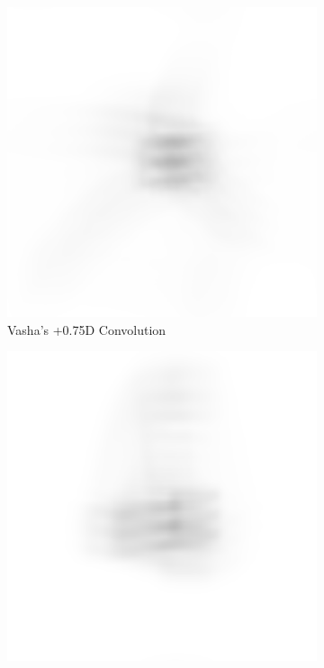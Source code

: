 \documentclass{article}
\begin{document}
\begin{figure}[H]
\begin{subfigure}{.3\textwidth}
  \centering
  \includegraphics[width=1\linewidth]{Vasha_R_G_0530_2_500_zer_075_5_PSF_convE.png}
  \caption{Vasha's +0.75D Convolution}
  \label{fig:vasha075d}
\end{subfigure}
\begin{subfigure}{.3\textwidth}
  \centering
  \includegraphics[width=1\linewidth]{Liz_R_G_0523_2_500_zer_075_5_PSF_convE.png}

\end{subfigure}
\end{figure}
\end{document}
